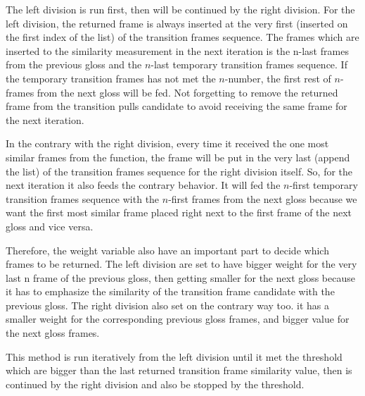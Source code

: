 \documentclass{sig-alternate-05-2015}
\begin{document}
The left division is run first, then will be continued by the right division. For the left division, the returned frame is always inserted at the very first (inserted on the first index of the list) of the transition frames sequence. The frames which are inserted to the similarity measurement in the next iteration is the n-last frames from the previous gloss and the \begin{math}n\end{math}-last temporary transition frames sequence. If the temporary transition frames has not met the \begin{math}n\end{math}-number, the first rest of \begin{math}n\end{math}-frames from the next gloss will be fed. Not forgetting to remove the returned frame from the transition pulls candidate to avoid receiving the same frame for the next iteration.

In the contrary with the right division, every time it received the one most similar frames from the function, the frame will be put in the very last (append the list) of the transition frames sequence for the right division itself. So, for the next iteration it also feeds the contrary behavior. It will fed the \begin{math}n\end{math}-first temporary transition frames sequence with the \begin{math}n\end{math}-first frames from the next gloss because we want the first most similar frame placed right next to the first frame of the next gloss and vice versa.

Therefore, the weight variable also have an important part to decide which frames to be returned. The left division are set to have bigger weight for the very last n frame of the previous gloss, then getting smaller for the next gloss because it has to emphasize the similarity of the transition frame candidate with the previous gloss. The right division also set on the contrary way too. it has a smaller weight for the corresponding previous gloss frames, and bigger value for the next gloss frames.

This method is run iteratively from the left division until it met the threshold which are bigger than the last returned transition frame similarity value, then is continued by the right division and also be stopped by the threshold.
\end{document}
